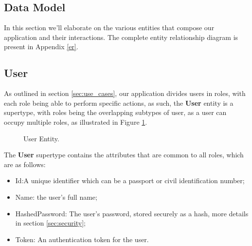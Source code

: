 \subsection{Data Model}\label{sec:data_models}
In this section we'll elaborate on the various entities that compose our application and their interactions.
The complete entity relationship diagram is present in Appendix \ref{er}.

\subsection{User}

As outlined in section \ref{sec:use_cases}, our application divides users in roles, with each role being able to perform specific actions, as such, the \textbf{User} entity is a supertype, with roles being the overlapping subtypes of user, as a user can occupy multiple roles, as illustrated in Figure \ref{fig:user_entity}.

\begin{figure}[H]
	\begin{center}
	\end{center}
	\caption{User Entity.}\label{fig:user_entity}
\end{figure}

The \textbf{User} supertype contains the attributes that are common to all roles, which are as follows:

\begin{itemize}
	\item Id:A unique identifier which can be a passport or civil identification number;
	\item Name: the user's full name;
	\item HashedPassword: The user's password, stored securely as a hash, more details in section \ref{sec:security};
	\item Token: An authentication token for the user.
\end{itemize}

